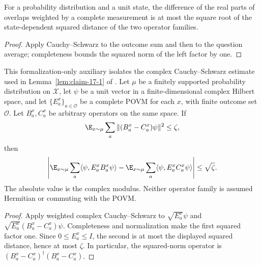 \begin{lemma}
	\label{lem:overlap-gap-distance}
	\leanok
	For a probability distribution and a unit state, the difference of the
	real parts of overlaps weighted by a complete measurement is at most
	the square root of the state-dependent squared distance of the two
	operator families.
\end{lemma}
\begin{proof}
	\leanok
	Apply Cauchy--Schwarz to the outcome sum and then to the question average;
	completeness bounds the squared norm of the left factor by one.
\end{proof}

\begin{theorem}
	\label{thm:complex-overlap-gap-distance}
	\leanok
	This formalization-only auxiliary isolates the complex Cauchy--Schwarz
	estimate used in Lemma~\ref{lem:claim-17-1} of \cite{Ji2020MIPStar}.
	Let $\mu$ be a finitely supported probability distribution on $\mathcal X$,
	let $\psi$ be a unit vector in a finite-dimensional complex Hilbert space,
	and let $\{E^x_a\}_{a\in\mathcal O}$ be a complete POVM for each $x$,
	with finite outcome set $\mathcal O$. Let $B^x_a,C^x_a$ be arbitrary
	operators on the same space. If
	\[
		\E_{x\sim\mu}\sum_a\|(B^x_a-C^x_a)\psi\|^2\le\zeta,
	\]
	then
	\[
		\left|\E_{x\sim\mu}\sum_a\langle\psi,E^x_aB^x_a\psi\rangle
		-\E_{x\sim\mu}\sum_a\langle\psi,E^x_aC^x_a\psi\rangle\right|
		\le\sqrt\zeta.
	\]
	The absolute value is the complex modulus. Neither operator family is
	assumed Hermitian or commuting with the POVM.
\end{theorem}
\begin{proof}
	\leanok
	Apply weighted complex Cauchy--Schwarz to $\sqrt{E^x_a}\psi$ and
	$\sqrt{E^x_a}(B^x_a-C^x_a)\psi$. Completeness and normalization make
	the first squared factor one. Since $0\le E^x_a\le I$, the second
	is at most the displayed squared distance, hence at most $\zeta$.
	In particular, the squared-norm operator is
	$(B^x_a-C^x_a)^\dagger(B^x_a-C^x_a)$.
\end{proof}

